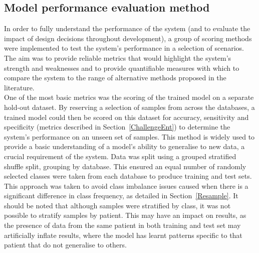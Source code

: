 \documentclass[titlepage, 12pt]{scrartcl} \usepackage{enumitem}
\begin{document}
\subsection{Model performance evaluation method}\label{metrics}
In order to fully understand the performance of the system (and to evaluate the
impact of design decisions throughout development), a group of scoring methods
were implemented to test the system's performance in a selection of scenarios.
The aim was to provide reliable metrics that would highlight the system's
strength and weaknesses and to provide quantifiable measures with which to
compare the system to the range of alternative methods proposed in the
literature.\\

One of the most basic metrics was the scoring of the trained model on a
separate hold-out dataset. By reserving a selection of samples from across the
databases, a trained model could then be scored on this dataset for accuracy, sensitivity and
specificity (metrics described in Section~\ref{ChallengeEnt}) to determine the
system's performance on an unseen set of samples. This method is widely used to
provide a basic understanding of a model's ability to generalise to new data, a
crucial requirement of the system. Data was split using a grouped stratified shuffle
split, grouping by database. This ensured an equal number of randomly selected
classes were taken from each database to produce training and test sets. This
approach was taken to avoid class imbalance issues caused when there is a
significant difference in class frequency, as detailed in
Section~\ref{Resample}. It should be noted that although samples were
stratified by class, it was not possible to stratify samples by patient. This
may have an impact on results, as the presence of data from the same patient in
both training and test set may artificially inflate results, where the model has
learnt patterns specific to that patient that do not generalise to others.\\
\end{document}
